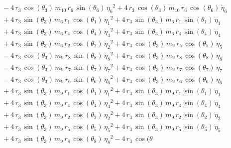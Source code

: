 \begin{eqnarray*}
 \\ &&\quad\mbox{} - 4\,r_{3}\,\cos({\theta_{3}})\,m_{10}\,r_{6}\,\sin
({\theta_{6}})\,{{\eta_{6}}}^2 + 4\,r_{3}\,\cos({\theta_{3}})\,m_{10}
\,r_{6}\,\cos({\theta_{6}})\,{\dot{\eta}_{6}} \\ &&\quad\mbox{} + 4\,r
_{3}\,\sin({\theta_{3}})\,m_{6}\,r_{1}\,\cos({\theta_{1}})\,{{\eta_{1}
}}^2 + 4\,r_{3}\,\sin({\theta_{3}})\,m_{6}\,r_{1}\,\sin({\theta_{1}})
\,{\dot{\eta}_{1}} \\ &&\quad\mbox{} + 4\,r_{3}\,\sin({\theta_{3}})\,m
_{6}\,r_{4}\,\cos({\theta_{4}})\,{{\eta_{4}}}^2 + 4\,r_{3}\,\sin({
\theta_{3}})\,m_{6}\,r_{4}\,\sin({\theta_{4}})\,{\dot{\eta}_{4}}
 \\ &&\quad\mbox{} + 4\,r_{3}\,\sin({\theta_{3}})\,m_{6}\,r_{2}\,\cos(
{\theta_{2}})\,{{\eta_{2}}}^2 + 4\,r_{3}\,\cos({\theta_{3}})\,m_{9}\,r
_{5}\,\cos({\theta_{5}})\,{\dot{\eta}_{5}} \\ &&\quad\mbox{} - 4\,r_{3
}\,\cos({\theta_{3}})\,m_{9}\,r_{8}\,\sin({\theta_{8}})\,{{\eta_{8}}}^
2 + 4\,r_{3}\,\cos({\theta_{3}})\,m_{9}\,r_{8}\,\cos({\theta_{8}})\,{
\dot{\eta}_{8}} \\ &&\quad\mbox{} - 4\,r_{3}\,\cos({\theta_{3}})\,m_{9
}\,r_{7}\,\sin({\theta_{7}})\,{{\eta_{7}}}^2 + 4\,r_{3}\,\cos({\theta
_{3}})\,m_{9}\,r_{7}\,\cos({\theta_{7}})\,{\dot{\eta}_{7}}
 \\ &&\quad\mbox{} - 4\,r_{3}\,\cos({\theta_{3}})\,m_{9}\,r_{6}\,\sin(
{\theta_{6}})\,{{\eta_{6}}}^2 + 4\,r_{3}\,\cos({\theta_{3}})\,m_{9}\,r
_{6}\,\cos({\theta_{6}})\,{\dot{\eta}_{6}} \\ &&\quad\mbox{} + 4\,r_{3
}\,\sin({\theta_{3}})\,m_{9}\,r_{1}\,\cos({\theta_{1}})\,{{\eta_{1}}}^
2 + 4\,r_{3}\,\sin({\theta_{3}})\,m_{9}\,r_{1}\,\sin({\theta_{1}})\,{
\dot{\eta}_{1}} \\ &&\quad\mbox{} + 4\,r_{3}\,\sin({\theta_{3}})\,m_{9
}\,r_{4}\,\cos({\theta_{4}})\,{{\eta_{4}}}^2 + 4\,r_{3}\,\sin({\theta
_{3}})\,m_{9}\,r_{4}\,\sin({\theta_{4}})\,{\dot{\eta}_{4}}
 \\ &&\quad\mbox{} + 4\,r_{3}\,\sin({\theta_{3}})\,m_{9}\,r_{2}\,\cos(
{\theta_{2}})\,{{\eta_{2}}}^2 + 4\,r_{3}\,\sin({\theta_{3}})\,m_{9}\,r
_{2}\,\sin({\theta_{2}})\,{\dot{\eta}_{2}} \\ &&\quad\mbox{} + 4\,r_{3
}\,\sin({\theta_{3}})\,m_{9}\,r_{5}\,\cos({\theta_{5}})\,{{\eta_{5}}}^
2 + 4\,r_{3}\,\sin({\theta_{3}})\,m_{9}\,r_{5}\,\sin({\theta_{5}})\,{
\dot{\eta}_{5}} \\ &&\quad\mbox{} + 4\,r_{3}\,\sin({\theta_{3}})\,m_{9
}\,r_{8}\,\cos({\theta_{8}})\,{{\eta_{8}}}^2 - 4\,r_{3}\,\cos({\theta
}
\end{eqnarray*}
